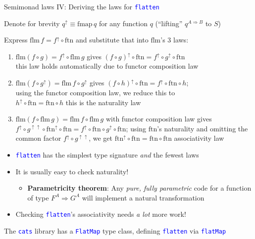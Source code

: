 \documentclass[english]{beamer}
\begin{document}
\begin{frame}{Semimonad laws IV: Deriving the laws for \texttt{\textcolor{blue}{\footnotesize{}flatten}} }

Denote for brevity $q^{\uparrow}\equiv\text{fmap}\,q$ for any function
$q$ (``lifting'' $q^{A\Rightarrow B}$ to $S$)

Express $\text{flm}\,f=f^{\uparrow}\circ\text{ftn}$ and substitute
that into $\text{flm}$'s 3 laws:
\begin{enumerate}
\item {\footnotesize{}$\text{flm}\left(f\circ g\right)=f^{\uparrow}\circ\text{flm}\,g$}
gives {\footnotesize{}$\left(f\circ g\right)^{\uparrow}\circ\text{ftn}=f^{\uparrow}\circ g^{\uparrow}\circ\text{ftn}$}\\
\textendash{} this law holds automatically due to functor composition
law
\item {\footnotesize{}$\text{flm}\left(f\circ g^{\uparrow}\right)=\text{flm}\,f\circ g^{\uparrow}$}
gives {\footnotesize{}$\left(f\circ h\right)^{\uparrow}\circ\text{ftn}=f^{\uparrow}\circ\text{ftn}\circ h$};\\
using the functor composition law, we reduce this to\\
{\footnotesize{}$h^{\uparrow}\circ\text{ftn}=\text{ftn}\circ h$}
\textendash{} this is the naturality law
\item {\footnotesize{}$\text{flm}\left(f\circ\text{flm}\,g\right)=\text{flm}\,f\circ\text{flm}\,g$
}with functor composition law gives{\footnotesize{} $f^{\uparrow}\circ g^{\uparrow\uparrow}\circ\text{ftn}^{\uparrow}\circ\text{ftn}=f^{\uparrow}\circ\text{ftn}\circ g^{\uparrow}\circ\text{ftn}$;}
using {\footnotesize{}$\text{ftn}$}'s naturality and omitting the
common factor{\footnotesize{} $f^{\uparrow}\circ g^{\uparrow\uparrow}$},
we get{\footnotesize{} $\text{ftn}^{\uparrow}\circ\text{ftn}=\text{ftn}\circ\text{ftn}$}
\textendash{} associativity law
\end{enumerate}
\begin{itemize}
\item \texttt{\textcolor{blue}{\footnotesize{}flatten}} has the simplest
type signature \emph{and} the fewest laws
\item It is usually easy to check naturality!
\begin{itemize}
\item \textbf{Parametricity theorem}: Any \emph{pure, fully parametric}
code for a function of type $F^{A}\Rightarrow G^{A}$ will implement
a natural transformation
\end{itemize}
\item Checking \texttt{\textcolor{blue}{\footnotesize{}flatten}}'s associativity
needs \emph{a lot} more work!
\end{itemize}
The \texttt{\textcolor{blue}{\footnotesize{}cats}} library has a \texttt{\textcolor{blue}{\footnotesize{}FlatMap}}
type class, defining \texttt{\textcolor{blue}{\footnotesize{}flatten}}
via \texttt{\textcolor{blue}{\footnotesize{}flatMap}} 
\end{frame}
\end{document}
